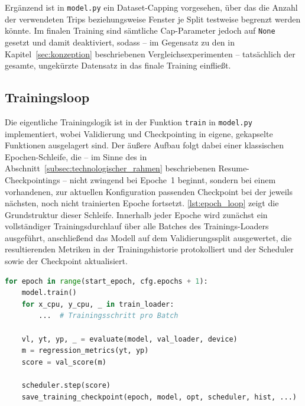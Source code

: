 Ergänzend ist in \texttt{model.py} ein Dataset-Capping vorgesehen, über das die Anzahl der verwendeten Trips beziehungsweise Fenster je Split testweise begrenzt werden könnte. Im finalen Training sind sämtliche Cap-Parameter jedoch auf \texttt{None} gesetzt und damit deaktiviert, sodass -- im Gegensatz zu den in Kapitel~\ref{sec:konzeption} beschriebenen Vergleichsexperimenten -- tatsächlich der gesamte, ungekürzte Datensatz in das finale Training einfließt.

\subsection{Trainingsloop}
\label{subsec:trainingsloop}

Die eigentliche Trainingslogik ist in der Funktion \texttt{train} in \texttt{model.py} implementiert, wobei Validierung und Checkpointing in eigene, gekapselte Funktionen ausgelagert sind. Der äußere Aufbau folgt dabei einer klassischen Epochen-Schleife, die -- im Sinne des in Abschnitt~\ref{subsec:technologischer_rahmen} beschriebenen Resume-Checkpointings -- nicht zwingend bei Epoche~1 beginnt, sondern bei einem vorhandenen, zur aktuellen Konfiguration passenden Checkpoint bei der jeweils nächsten, noch nicht trainierten Epoche fortsetzt. \autoref{lst:epoch_loop} zeigt die Grundstruktur dieser Schleife. Innerhalb jeder Epoche wird zunächst ein vollständiger Trainingsdurchlauf über alle Batches des Trainings-Loaders ausgeführt, anschließend das Modell auf dem Validierungssplit ausgewertet, die resultierenden Metriken in der Trainingshistorie protokolliert und der Scheduler sowie der Checkpoint aktualisiert.

\begin{lstlisting}[language=Python, caption={Grundstruktur der Epochen-Schleife in \texttt{model.py} (gekürzt).}, label={lst:epoch_loop}]
for epoch in range(start_epoch, cfg.epochs + 1):
    model.train()
    for x_cpu, y_cpu, _ in train_loader:
        ...  # Trainingsschritt pro Batch

    vl, yt, yp, _ = evaluate(model, val_loader, device)
    m = regression_metrics(yt, yp)
    score = val_score(m)

    scheduler.step(score)
    save_training_checkpoint(epoch, model, opt, scheduler, hist, ...)
\end{lstlisting}

